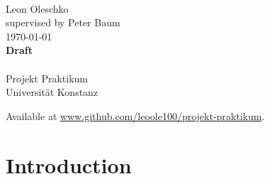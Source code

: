 \documentclass[
	a4paper,
]{scrarticle}
\begin{document}
\author{Leon Oleschko}
\date{\dotdate\today}

\begin{titlepage}
    \sffamily
    \vspace*{3cm}
    {
        \fontsize{32}{32}
    }
    \vspace{.25cm}\\
    {
        \Large
        Leon Oleschko\\
        supervised by Peter Baum
        \vspace{.05cm}\\
        \dotdate\today\\
        \textbf{Draft}\\
        \vspace{.05cm}\\
        \normalsize
        Projekt Praktikum\\
        Universität Konstanz
    }
    \vfill
    {
        \normalfont\normalsize
    }
    \vfill
    \begin{flushright}
        Available at \url{www.github.com/leoole100/projekt-praktikum}.
    \end{flushright}
\end{titlepage}


\clearpage

\section{Introduction}


\clearpage
\end{document}

